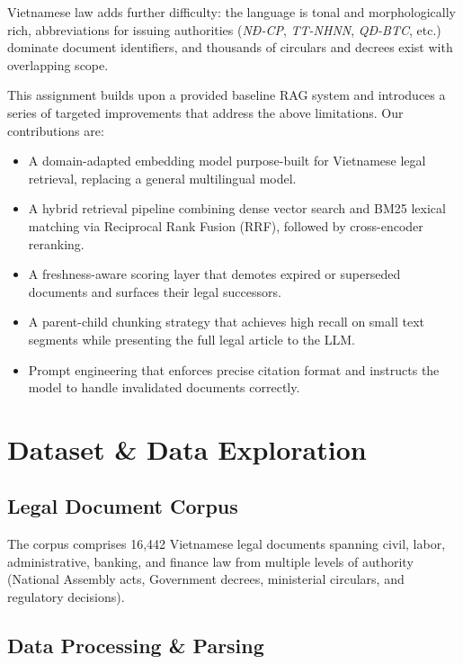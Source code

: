 \documentclass[conference]{IEEEtran}
\begin{document}
Vietnamese law adds further difficulty: the language is tonal and morphologically
rich, abbreviations for issuing authorities (\emph{NĐ-CP}, \emph{TT-NHNN},
\emph{QĐ-BTC}, etc.) dominate document identifiers, and thousands of circulars
and decrees exist with overlapping scope.

This assignment builds upon a provided baseline RAG system and introduces a
series of targeted improvements that address the above limitations. Our
contributions are:

\begin{itemize}
  \item A domain-adapted embedding model purpose-built for Vietnamese legal
        retrieval, replacing a general multilingual model.
  \item A hybrid retrieval pipeline combining dense vector search and BM25
        lexical matching via Reciprocal Rank Fusion (RRF), followed by
        cross-encoder reranking.
  \item A freshness-aware scoring layer that demotes expired or superseded
        documents and surfaces their legal successors.
  \item A parent-child chunking strategy that achieves high recall on small
        text segments while presenting the full legal article to the LLM.
  \item Prompt engineering that enforces precise citation format and instructs
        the model to handle invalidated documents correctly.
\end{itemize}

\section{Dataset \& Data Exploration}

\subsection{Legal Document Corpus}

The corpus comprises 16,442 Vietnamese legal documents spanning civil, labor,
administrative, banking, and finance law from multiple levels of authority
(National Assembly acts, Government decrees, ministerial circulars, and
regulatory decisions).

\subsection{Data Processing \& Parsing}
\end{document}
